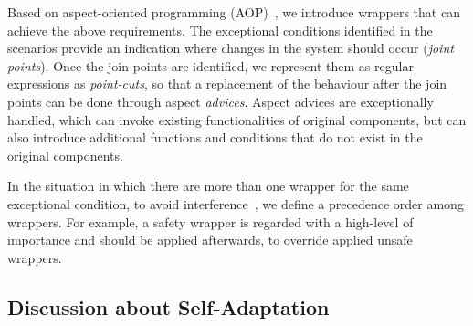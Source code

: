 Based on aspect-oriented programming (AOP)~\cite{Kiczales:2001}, we introduce wrappers that can achieve the above requirements. The exceptional conditions identified in the scenarios provide an indication where changes in the system should occur ({\it joint points}). Once the join points are identified, we represent them as regular expressions as {\it point-cuts}, so that a replacement of the behaviour after the join points can be done through aspect {\it advices}. Aspect advices are exceptionally handled, which can invoke existing functionalities of original components, but can also introduce additional functions and conditions that do not exist in the original components.




In the situation in which there are more than one wrapper for the same exceptional condition, to avoid interference~\cite{Katz:2008:IAI:1394496.1394500}, we define a precedence order among wrappers. For example, a safety wrapper is regarded with a high-level of importance and should be applied afterwards, to override applied unsafe wrappers. 

\subsection{Discussion about Self-Adaptation}

